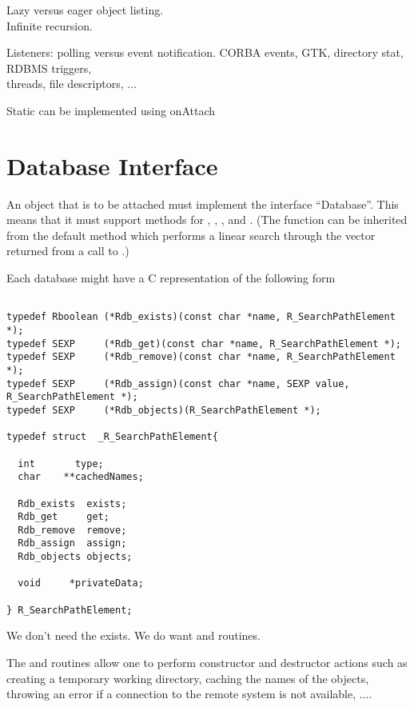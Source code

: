 \documentclass{article}
\begin{document}
Lazy versus eager object listing. \\
Infinite recursion.

Listeners: polling versus event notification.
 CORBA events, GTK, directory stat, RDBMS triggers,
\\
 threads, file descriptors, $\ldots$

Static can be implemented using onAttach

\section{Database Interface}

An object that is to be attached must implement the interface
``Database''. This means that it must support methods for
, , ,
 and .  (The 
function can be inherited from the default method which performs a
linear search through the vector returned from a call to
.)

Each database might have a C representation of the following
form
\begin{verbatim}

typedef Rboolean (*Rdb_exists)(const char *name, R_SearchPathElement *);
typedef SEXP     (*Rdb_get)(const char *name, R_SearchPathElement *);
typedef SEXP     (*Rdb_remove)(const char *name, R_SearchPathElement *);
typedef SEXP     (*Rdb_assign)(const char *name, SEXP value, R_SearchPathElement *);
typedef SEXP     (*Rdb_objects)(R_SearchPathElement *);

typedef struct  _R_SearchPathElement{

  int       type;
  char    **cachedNames;

  Rdb_exists  exists;
  Rdb_get     get;
  Rdb_remove  remove;
  Rdb_assign  assign;
  Rdb_objects objects;
  
  void     *privateData;

} R_SearchPathElement;
\end{verbatim}

We don't need the exists.  We do want  and
 routines.

The  and  routines allow one to
perform constructor and destructor actions such as creating a
temporary working directory, caching the names of the objects,
throwing an error if a connection to the remote system is not
available, $\ldots$.
\end{document}
